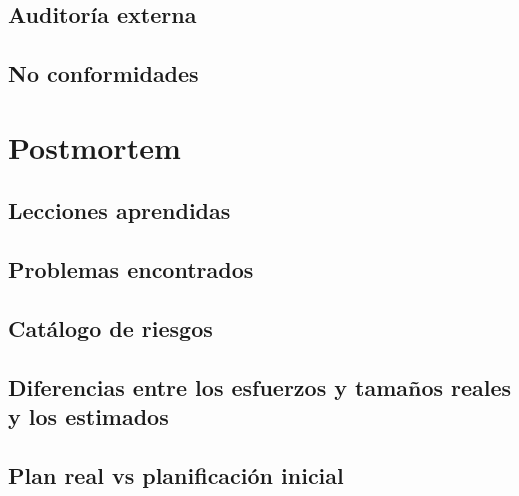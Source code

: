 \documentclass[10pt,spanish]{article}
\begin{document}
\subsection{Auditoría externa}

\blindtext
\subsection{No conformidades}

\blindtext

\section{Postmortem}

\blindtext
\subsection{Lecciones aprendidas}

\blindtext
\subsection{Problemas encontrados}

\blindtext
\subsection{Catálogo de riesgos}

\blindtext
\subsection{Diferencias entre los esfuerzos y tamaños reales y los estimados}

\blindtext
\subsection{Plan real vs planificación inicial}

\blindtext
\end{document}
